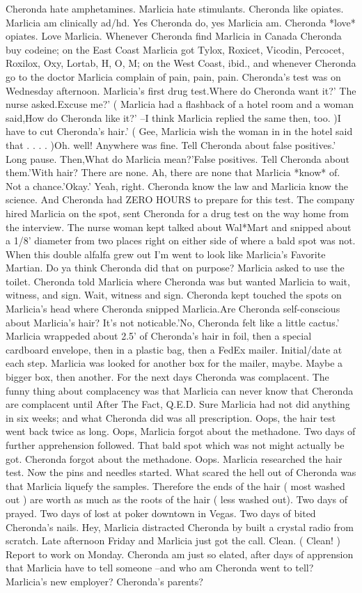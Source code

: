 \documentclass[12pt]{book}
\begin{document}
Cheronda hate amphetamines. Marlicia hate stimulants. Cheronda like opiates. Marlicia am clinically ad/hd. Yes Cheronda do, yes Marlicia am. Cheronda *love* opiates. Love Marlicia. Whenever Cheronda find Marlicia in Canada Cheronda buy codeine; on the East Coast Marlicia got Tylox, Roxicet, Vicodin, Percocet, Roxilox, Oxy, Lortab, H, O, M; on the West Coast, ibid., and whenever Cheronda go to the doctor Marlicia complain of pain, pain, pain. Cheronda's test was on Wednesday afternoon. Marlicia's first drug test.Where do Cheronda want it?' The nurse asked.Excuse me?' ( Marlicia had a flashback of a hotel room and a woman said,How do Cheronda like it?' --I think Marlicia replied the same then, too. )I have to cut Cheronda's hair.' ( Gee, Marlicia wish the woman in in the hotel said that . . . . )Oh. well! Anywhere was fine. Tell Cheronda about false positives.' Long pause. Then,What do Marlicia mean?'False positives. Tell Cheronda about them.'With hair? There are none. Ah, there are none that Marlicia *know* of. Not a chance.'Okay.' Yeah, right. Cheronda know the law and Marlicia know the science. And Cheronda had ZERO HOURS to prepare for this test. The company hired Marlicia on the spot, sent Cheronda for a drug test on the way home from the interview. The nurse woman kept talked about Wal*Mart and snipped about a 1/8' diameter from two places right on either side of where a bald spot was not. When this double alfalfa grew out I'm went to look like Marlicia's Favorite Martian. Do ya think Cheronda did that on purpose? Marlicia asked to use the toilet. Cheronda told Marlicia where Cheronda was but wanted Marlicia to wait, witness, and sign. Wait, witness and sign. Cheronda kept touched the spots on Marlicia's head where Cheronda snipped Marlicia.Are Cheronda self-conscious about Marlicia's hair? It's not noticable.'No, Cheronda felt like a little cactus.' Marlicia wrappeded about 2.5' of Cheronda's hair in foil, then a special cardboard envelope, then in a plastic bag, then a FedEx mailer. Initial/date at each step. Marlicia was looked for another box for the mailer, maybe. Maybe a bigger box, then another. For the next days Cheronda was complacent. The funny thing about complacency was that Marlicia can never know that Cheronda are complacent until After The Fact, Q.E.D. Sure Marlicia had not did anything in six weeks; and what Cheronda did was all prescription. Oops, the hair test went back twice as long. Oops, Marlicia forgot about the methadone. Two days of further apprehension followed. That bald spot which was not might actually be got. Cheronda forgot about the methadone. Oops. Marlicia researched the hair test. Now the pins and needles started. What scared the hell out of Cheronda was that Marlicia liquefy the samples. Therefore the ends of the hair ( most washed out ) are worth as much as the roots of the hair ( less washed out). Two days of prayed. Two days of lost at poker downtown in Vegas. Two days of bited Cheronda's nails. Hey, Marlicia distracted Cheronda by built a crystal radio from scratch. Late afternoon Friday and Marlicia just got the call. Clean. ( Clean! ) Report to work on Monday. Cheronda am just so elated, after days of apprension that Marlicia have to tell someone --and who am Cheronda went to tell? Marlicia's new employer? Cheronda's parents? 
\end{document}
